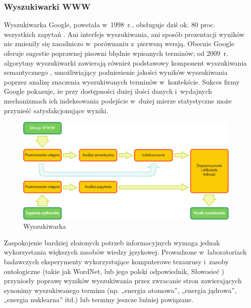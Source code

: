 \begin{multicols}{2}
\subsubsection[Wyszukiwarki WWW]{Wyszukiwarki WWW} Wyszukiwarka
Google, powstała w~1998~r., obsługuje dziś ok. 80 proc. wszystkich
zapytań \cite{spi1}. Ani interfejs wyszukiwania, ani sposób
prezentacji wyników nie zmieniły się zasadniczo w~porównaniu
z~pierwszą wersją. Obecnie Google oferuje sugestie poprawnej pisowni
błędnie wpisanych terminów; od 2009~r. algorytmy wyszukiwarki
zawierają również podstawowy komponent wyszukiwania semantycznego
\cite{pc1}, umożliwiający podniesienie jakości wyników
wyszukiwania poprzez analizę znaczenia wyszukiwanych terminów
w~kontekście. Sukces firmy Google pokazuje, że przy dostępności
dużej ilości danych i~wydajnych mechanizmach ich indeksowania
podejście w~dużej mierze statystyczne może przynieść
satysfakcjonujące wyniki. 

\begin{figure}[htb]  \center
\includegraphics[width=\textwidth]{../_media/polish/web_search_architecture}
\caption{Wyszukiwarka} \label{fig:websearcharch_pl}
 \end{figure} 


Zaspokojenie bardziej złożonych potrzeb informacyjnych wymaga jednak
wykorzystania większych zasobów wiedzy językowej. Prowadzone
w~laboratoriach badawczych eksperymenty wykorzystujące komputerowe
tezaurusy i~zasoby ontologiczne (takie jak WordNet, lub jego polski
odpowiednik, Słowosieć \cite{Slowosiec1, Piasecki2009}) przyniosły
poprawę wyników wyszukiwania przez zwracanie stron zawierających
synonimy wyszukiwanego terminu (np. „energia atomowa”, „energia
jądrowa”, „energia nuklearna” itd.) lub terminy jeszcze
luźniej powiązane.


\end{multicols}
